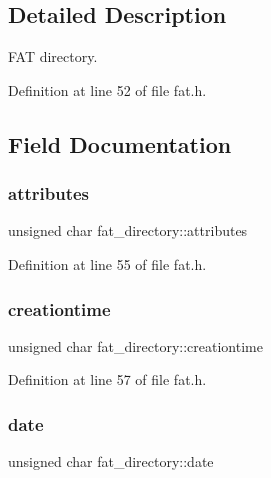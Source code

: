 \subsection{Detailed Description}
F\+AT directory. 

Definition at line 52 of file fat.\+h.



\subsection{Field Documentation}
\mbox{\label{a00061_aa516fe54146f6dcb3bdb75721f5f03d0_aa516fe54146f6dcb3bdb75721f5f03d0}} 
\subsubsection{\texorpdfstring{attributes}{attributes}}
{\footnotesize\ttfamily unsigned char fat\+\_\+directory\+::attributes}



Definition at line 55 of file fat.\+h.

\mbox{\label{a00061_ab588da02acbe9c2caf2f85828a162fcc_ab588da02acbe9c2caf2f85828a162fcc}} 
\subsubsection{\texorpdfstring{creationtime}{creationtime}}
{\footnotesize\ttfamily unsigned char fat\+\_\+directory\+::creationtime}



Definition at line 57 of file fat.\+h.

\mbox{\label{a00061_aa80d47ffcb829a15327d9ac115d29e9d_aa80d47ffcb829a15327d9ac115d29e9d}} 
\subsubsection{\texorpdfstring{date}{date}}
{\footnotesize\ttfamily unsigned char fat\+\_\+directory\+::date}



